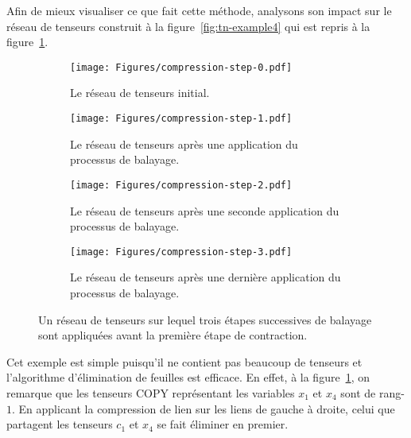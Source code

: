 Afin de mieux visualiser ce que fait cette méthode, analysons son impact sur le réseau de tenseurs construit à la figure~\ref{fig:tn-example4} qui est repris à la figure~\ref{subfig:compression-step-0}.
\begin{figure}[h]
    \centering
    \begin{subfigure}{.45\textwidth}
        \centering
        \texttt{[image: Figures/compression-step-0.pdf]}
        \caption{Le réseau de tenseurs initial.}
        \label{subfig:compression-step-0}
    \end{subfigure}
    \hspace{0.04\textwidth}
    \begin{subfigure}{.45\textwidth}
        \centering
        \texttt{[image: Figures/compression-step-1.pdf]}
        \caption{Le réseau de tenseurs après une application du processus de balayage.}
        \label{subfig:compression-step-1}
    \end{subfigure}

    \medskip

    \begin{subfigure}{.45\textwidth}
        \centering
        \texttt{[image: Figures/compression-step-2.pdf]}
        \caption{Le réseau de tenseurs après une seconde application du processus de balayage.}
        \label{subfig:compression-step-2}
    \end{subfigure}
    \hspace{0.04\textwidth}
    \begin{subfigure}{.45\textwidth}
        \centering
        \texttt{[image: Figures/compression-step-3.pdf]}
        \caption{Le réseau de tenseurs après une dernière application du processus de balayage.}
        \label{subfig:compression-step-3}
    \end{subfigure}
    \caption{Un réseau de tenseurs sur lequel trois étapes successives de balayage sont appliquées avant la première étape de contraction.}
    \label{fig:compression-steps-on-tn-example}
\end{figure}
Cet exemple est simple puisqu'il ne contient pas beaucoup de tenseurs et l'algorithme d'élimination de feuilles est efficace.
En effet, à la figure~\ref{subfig:compression-step-0}, on remarque que les tenseurs COPY représentant les variables $x_1$ et $x_4$ sont de rang-$1$.
En applicant la compression de lien sur les liens de gauche à droite, celui que partagent les tenseurs $c_1$ et $x_4$ se fait éliminer en premier.
